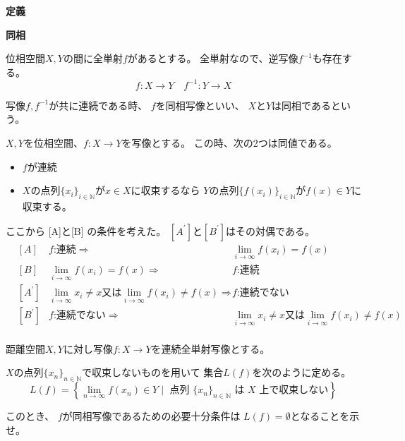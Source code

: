 \documentclass[12pt,b5paper]{ltjsarticle}
\begin{document}
\hrulefill
\textbf{定義}
\hrulefill

\textbf{同相}

位相空間$X,Y$の間に全単射$f$があるとする。
全単射なので、逆写像$f^{-1}$も存在する。
\begin{equation}
 f: X \rightarrow Y
  \quad
  f^{-1}: Y \rightarrow X
\end{equation}

写像$f,f^{-1}$が共に連続である時、
$f$を同相写像といい、
$X$と$Y$は同相であるという。


\dotfill

$X,Y$を位相空間、$f:X\to Y$を写像とする。
この時、次の2つは同値である。
\begin{itemize}
 \item $f$が連続
 \item
      $X$の点列$\{x_i\}_{i\in\mathbb{N}}$が$x\in X$に収束するなら
      $Y$の点列$\{f(x_i)\}_{i\in\mathbb{N}}$が$f(x)\in Y$に収束する。
\end{itemize}

ここから [A]と[B] の条件を考えた。
$[A^{\prime}]と[B^{\prime}]$はその対偶である。
\begin{align}
& [A] & f\text{:連続} \Rightarrow& \lim_{i\to\infty}f(x_i)=f(x)\\
& [B] & \lim_{i\to\infty}f(x_i)=f(x) \Rightarrow& f\text{:連続}\\
& [A^\prime] & \lim_{i\to\infty}x_i \ne x \text{又は} \lim_{i\to\infty}f(x_i)\ne f(x) \Rightarrow&  f\text{:連続でない}\\
& [B^\prime] & f\text{:連続でない} \Rightarrow& \lim_{i\to\infty}x_i \ne x \text{又は} \lim_{i\to\infty}f(x_i)\ne f(x) \\
\end{align}



\hrulefill



距離空間$X,Y$に対し写像$f:X \to Y$を連続全単射写像とする。

$X$の点列$\{x_n\}_{n\in\mathbb{N}}$で収束しないものを用いて
集合$L(f)$を次のように定める。
\begin{equation}
 L(f)= \left\{ \lim_{n\to\infty}f(x_n) \in Y \mid
  \text{ 点列 }\{x_n\}_{n\in\mathbb{N}}\text{ は }X\text{ 上で収束しない} \right\}
\end{equation}

このとき、
$f$が同相写像であるための必要十分条件は
$L(f)=\emptyset$となることを示せ。

\dotfill
\end{document}
